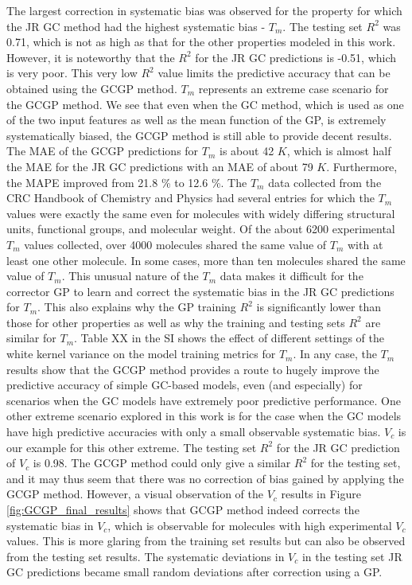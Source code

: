 \documentclass[journal=jacsat,manuscript=article]{achemso}
\begin{document}
 
The largest correction in systematic bias was observed for the property for which the JR GC method had the highest systematic bias - $T_m$. The testing set $R^2$ was 0.71, which is not as high as that for the other properties modeled in this work. However, it is noteworthy that the $R^2$ for the JR GC predictions is -0.51, which is very poor. This very low $R^2$ value limits the predictive accuracy that can be obtained using the GCGP method. $T_m$ represents an extreme case scenario for the GCGP method. We see that even when the GC method, which is used as one of the two input features as well as the mean function of the GP, is extremely systematically biased, the GCGP method is still able to provide decent results. The MAE of the GCGP predictions for $T_m$ is about 42 $K$, which is almost half the MAE for the JR GC predictions with an MAE of about 79 $K$. Furthermore, the MAPE improved from 21.8 \% to 12.6 \%. The $T_m$ data collected from the CRC Handbook of Chemistry and Physics had several entries for which the $T_m$ values were exactly the same even for molecules with widely differing structural units, functional groups, and molecular weight. Of the about 6200 experimental $T_m$  values collected, over 4000 molecules shared the same value of $T_m$ with at least one other molecule. In some cases, more than ten molecules shared the same value of $T_m$. This unusual nature of the $T_m$ data makes it difficult for the corrector GP to learn and correct the systematic bias in the JR GC predictions for $T_m$. This also explains why the GP training $R^2$ is significantly lower than those for other properties as well as why the training and testing sets $R^2$ are similar for $T_m$. Table XX in the SI shows the effect of different settings of the white kernel variance on the model training metrics for $T_m$. In any case, the $T_m$ results show that the GCGP method provides a route to hugely improve the predictive accuracy of simple GC-based models, even (and especially) for scenarios when the GC models have extremely poor predictive performance. One other extreme scenario explored in this work is for the case when the GC models have high predictive accuracies with only a small observable systematic bias. $V_c$ is our example for this other extreme. The testing set $R^2$ for the JR GC prediction of $V_c$ is 0.98. The GCGP method could only give a similar $R^2$ for the testing set, and it may thus seem that there was no correction of bias gained by applying the GCGP method. However, a visual observation of the $V_c$ results in Figure \ref{fig:GCGP_final_results} shows that GCGP method indeed corrects the systematic bias in $V_c$, which is observable for molecules with high experimental $V_c$ values. This is more glaring from the training set results but can also be observed from the testing set results. The systematic deviations in $V_c$ in the testing set JR GC predictions became small random deviations after correction using a GP.
\end{document}
